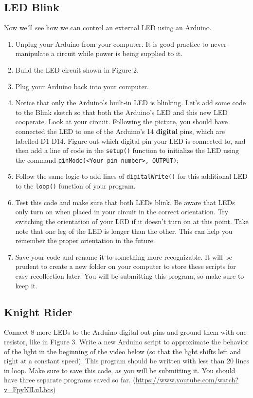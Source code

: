 \documentclass[12pt]{article}
\begin{document}
	   \subsection*{LED Blink}
	   Now we'll see how we can control an external LED using an Arduino.
	   \begin{enumerate}
        	\item Unplug your Arduino from your computer. It is good practice to never manipulate a circuit while power is being supplied to it.
        	\item Build the LED circuit shown in Figure 2. 
        	
        	\item Plug your Arduino back into your computer. 
        	
        	\item Notice that only the Arduino’s built-in LED is blinking. Let’s add some code to the Blink sketch so that both the Arduino’s LED and this new LED cooperate. Look at your circuit. Following the picture, you should have connected the LED to one of the Arduino’s 14 \textbf{digital} pins, which are labelled D1-D14. Figure out which digital pin your LED is connected to, and then add a line of code in the \verb|setup()| function to initialize the LED using the command \verb|pinMode(<Your pin number>, OUTPUT)|;
        	
        	\item Follow the same logic to add lines of \verb|digitalWrite()| for this additional LED to the \verb|loop()| function of your program.
        	
        	\item Test this code and make sure that both LEDs blink. Be aware that LEDs only turn on when placed in your circuit in the correct orientation. Try switching the orientation of your LED if it doesn't turn on at this point. Take note that one leg of the LED is longer than the other. This can help you remember the proper orientation in the future.
        	
        	\item Save your code and rename it to something more recognizable. It will be prudent to create a new folder on your computer to store these scripts for easy recollection later. You will be submitting this program, so make sure to keep it.
        	
        \end{enumerate}
        
        \subsection*{Knight Rider}
        Connect 8 more LEDs to the Arduino digital out pins and ground them with one resistor, like in Figure 3. Write a new Arduino script to approximate the behavior of the light in the beginning of the video below (so that the light shifts left and right at a constant speed). This program should be written with less than 20 lines in loop. Make sure to save this code, as you will be submitting it. You should have three separate programs saved so far. (\url{https://www.youtube.com/watch?v=FpyKlLuLbcs})
        
\end{document}
